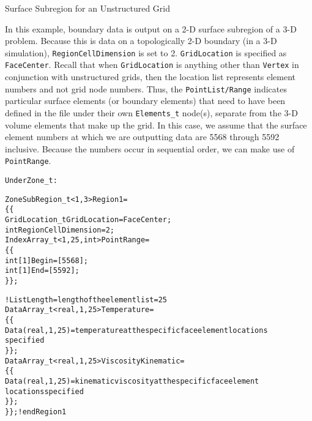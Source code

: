 \begin{example}{Surface Subregion for an Unstructured Grid}
\label{ex:zonesubregion3}

In this example, boundary data is output on a 2-D surface subregion of a 3-D problem.
Because this is data on a topologically 2-D boundary (in a 3-D simulation),
\texttt{RegionCellDimension} is set to 2. \texttt{GridLocation} is specified as
\texttt{FaceCenter}. Recall that when \texttt{GridLocation} is anything other than
\texttt{Vertex} in conjunction with unstructured grids, then the location list
represents element numbers and not grid node numbers. Thus, the \texttt{PointList/Range}
indicates particular surface elements (or boundary elements) that need to have been
defined in the file under their own \texttt{Elements\_t} node(s),
separate from the 3-D volume elements that make up the grid.
In this case, we assume that the surface element numbers at which we are outputting
data are 5568 through 5592 inclusive. Because the numbers occur in sequential order,
we can make use of \texttt{PointRange}.

\begin{alltt}
Under Zone\_t:

  ZoneSubRegion\_t<1,3> Region1 =
    \{\{
    GridLocation\_t GridLocation = FaceCenter ;
    int RegionCellDimension = 2;
    IndexArray\_t<1,25,int> PointRange =
      \{\{
      int[1] Begin = [5568];
      int[1] End = [5592];
      \}\} ;

    ! ListLength = length of the element list = 25
    DataArray\_t<real,1,25> Temperature =
      \{\{
      Data(real,1,25) = temperature at the specific face element locations 
                        specified
      \}\} ;
    DataArray\_t<real,1,25> ViscosityKinematic =
      \{\{
      Data(real,1,25) = kinematic viscosity at the specific face element 
                        locations specified
      \}\} ;
    \}\} ; ! end Region1
\end{alltt}

\end{example}

